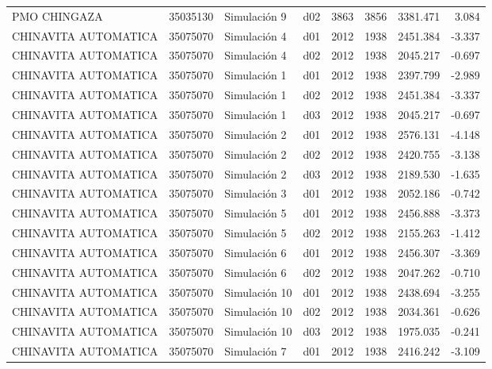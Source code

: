\begin{landscape}
\begin{longtable}{lrlp{2cm}p{2cm}p{3cm}p{2cm}r}
            PMO CHINGAZA &  35035130 &   Simulación 9 &   d02 &      3863 &     3856 &  3381.471 &     3.084 \\
    CHINAVITA AUTOMATICA &  35075070 &   Simulación 4 &   d01 &      2012 &     1938 &  2451.384 &    -3.337 \\
    CHINAVITA AUTOMATICA &  35075070 &   Simulación 4 &   d02 &      2012 &     1938 &  2045.217 &    -0.697 \\
    CHINAVITA AUTOMATICA &  35075070 &   Simulación 1 &   d01 &      2012 &     1938 &  2397.799 &    -2.989 \\
    CHINAVITA AUTOMATICA &  35075070 &   Simulación 1 &   d02 &      2012 &     1938 &  2451.384 &    -3.337 \\
    CHINAVITA AUTOMATICA &  35075070 &   Simulación 1 &   d03 &      2012 &     1938 &  2045.217 &    -0.697 \\
    CHINAVITA AUTOMATICA &  35075070 &   Simulación 2 &   d01 &      2012 &     1938 &  2576.131 &    -4.148 \\
    CHINAVITA AUTOMATICA &  35075070 &   Simulación 2 &   d02 &      2012 &     1938 &  2420.755 &    -3.138 \\
    CHINAVITA AUTOMATICA &  35075070 &   Simulación 2 &   d03 &      2012 &     1938 &  2189.530 &    -1.635 \\
    CHINAVITA AUTOMATICA &  35075070 &   Simulación 3 &   d01 &      2012 &     1938 &  2052.186 &    -0.742 \\
    CHINAVITA AUTOMATICA &  35075070 &   Simulación 5 &   d01 &      2012 &     1938 &  2456.888 &    -3.373 \\
    CHINAVITA AUTOMATICA &  35075070 &   Simulación 5 &   d02 &      2012 &     1938 &  2155.263 &    -1.412 \\
    CHINAVITA AUTOMATICA &  35075070 &   Simulación 6 &   d01 &      2012 &     1938 &  2456.307 &    -3.369 \\
    CHINAVITA AUTOMATICA &  35075070 &   Simulación 6 &   d02 &      2012 &     1938 &  2047.262 &    -0.710 \\
    CHINAVITA AUTOMATICA &  35075070 &  Simulación 10 &   d01 &      2012 &     1938 &  2438.694 &    -3.255 \\
    CHINAVITA AUTOMATICA &  35075070 &  Simulación 10 &   d02 &      2012 &     1938 &  2034.361 &    -0.626 \\
    CHINAVITA AUTOMATICA &  35075070 &  Simulación 10 &   d03 &      2012 &     1938 &  1975.035 &    -0.241 \\
    CHINAVITA AUTOMATICA &  35075070 &   Simulación 7 &   d01 &      2012 &     1938 &  2416.242 &    -3.109 \\

\end{longtable}
\end{landscape}
